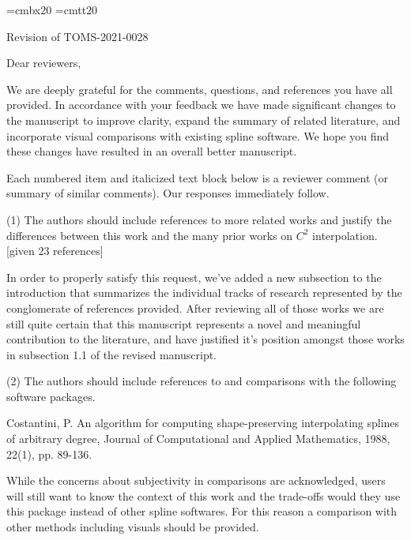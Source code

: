 
\parindent=0pt
\parskip=9pt

\font\titlebf=cmbx20
\font\titlett=cmtt20

{\titlebf Revision of {\titlett TOMS-2021-0028} \bigskip}

Dear reviewers,

We are deeply grateful for the comments, questions, and references you have all provided. In accordance with your feedback we have made significant changes to the manuscript to improve clarity, expand the summary of related literature, and incorporate visual comparisons with existing spline software. We hope you find these changes have resulted in an overall better manuscript.

Each numbered item and italicized text block below is a reviewer comment (or summary of similar comments). Our responses immediately follow.

{\parindent=20pt \it

\item{(1)} The authors should include references to more related works and justify the differences between this work and the many prior works on $C^2$ interpolation. [given 23 references]

}

In order to properly satisfy this request, we've added a new subsection to the introduction that summarizes the individual tracks of research represented by the conglomerate of references provided. After reviewing all of those works we are still quite certain that this manuscript represents a novel and meaningful contribution to the literature, and have justified it's position amongst those works in subsection 1.1 of the revised manuscript.


{\parindent=20pt \it

\item{(2)} The authors should include references to and comparisons with the following software packages.

\itemitem{} Costantini, P. An algorithm for computing shape-preserving interpolating splines
of arbitrary degree, Journal of Computational and Applied Mathematics, 1988, 22(1), pp. 89-136.

\item{} While the concerns about subjectivity in comparisons are acknowledged, users will still want to know the context of this work and the trade-offs would they use this package instead of other spline softwares. For this reason a comparison with other methods including visuals should be provided.

}

